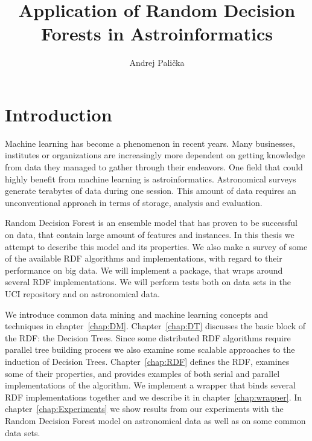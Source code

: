 \documentclass[thesis=B,english]{FITthesis}[2012/10/20]
\title{Application of Random Decision Forests in Astroinformatics}
\author{Andrej Pali{\v c}ka} %
\begin{document}

\chapter{Introduction}
Machine learning has become a phenomenon in recent years. Many businesses, institutes or organizations are increasingly more dependent on getting knowledge from data they managed to gather through their endeavors. One field that could highly benefit from machine learning is astroinformatics.  Astronomical surveys generate terabytes of data during one session. This amount of data requires an unconventional approach in terms of storage, analysis and evaluation.  

Random Decision Forest \cite{BR01} is an ensemble model that has proven to be successful on data, that contain large amount of features and instances. In this thesis we attempt to describe this model and its properties. We also make a survey of some of the available RDF algorithms and implementations, with regard to their performance on big data. We will implement a package, that wraps around several RDF implementations. We will perform tests both on data sets in the UCI repository \cite{uci} and on astronomical data.

We introduce common data mining and machine learning concepts and techniques in chapter~\ref{chap:DM}. Chapter~\ref{chap:DT} discusses the basic block of the RDF: the Decision Trees. Since some distributed RDF algorithms require parallel tree building process we also examine some scalable approaches to the induction of Decision Trees. Chapter~\ref{chap:RDF} defines the RDF, examines some of their properties, and provides examples of both serial and parallel implementations of the algorithm. We implement a wrapper that binds several RDF implementations together and we describe it in chapter~\ref{chap:wrapper}. In chapter~\ref{chap:Experiments} we show results from our experiments with the Random Decision Forest model on astronomical data as well as on some common data sets.
\end{document}
